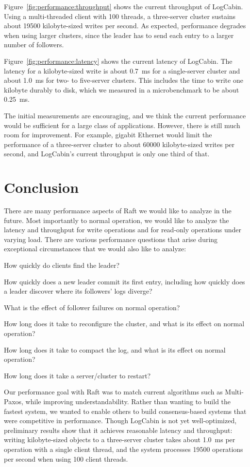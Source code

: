Figure~\ref{fig:performance:throughput} shows the current throughput of
LogCabin. Using a multi-threaded client with 100 threads, a three-server
cluster sustains about \num{19500} kilobyte-sized writes per second.
As expected, performance degrades when using larger clusters, since the
leader has to send each entry to a larger number of followers.


Figure~\ref{fig:performance:latency} shows the current latency of
LogCabin. The latency for a kilobyte-sized write is about
\SI{0.7}{\milli\second} for a single-server cluster and
about \SI{1.0}{\milli\second} for two- to five-server clusters.
This includes the time to write one kilobyte durably to disk,
which we measured in a microbenchmark to be about \SI{.25}{\milli\second}.

The initial measurements are encouraging, and we think the current
performance would be sufficient for a large class of applications.
However, there is still much room for improvement. For example, gigabit
Ethernet would limit the performance of a three-server cluster to
about \num{60000} kilobyte-sized writes per second, and
LogCabin's current throughput is only one third of that.


\section{Conclusion}

There are many performance aspects of Raft we would like to analyze in
the future. Most importantly to normal operation, we would like to
analyze the latency and throughput for write operations and for
read-only operations under varying load. There are various performance
questions that arise during exceptional circumstances that we would also
like to analyze:
%
\begin{compactitem}
%
\item How quickly do clients find the leader?
%
\item How quickly does a new leader commit its first entry, including
how quickly does a leader discover where its followers' logs diverge?
%
\item What is the effect of follower failures on normal operation?
%
\item How long does it take to reconfigure the cluster, and what is its
effect on normal operation?
%
\item How long does it take to compact the log, and what is its effect
on normal operation?
%
\item How long does it take a server/cluster to restart?
%
\end{compactitem}

Our performance goal with Raft was to match current algorithms such as
Multi-Paxos, while improving understandability. Rather than wanting to
build the fastest system, we wanted to enable others to build
consensus-based systems that were competitive in performance.
Though LogCabin is not yet well-optimized, preliminary results show
that it achieves reasonable latency and throughput: writing
kilobyte-sized objects to a three-server cluster takes about
\SI{1.0}{\milli\second} per operation with a single client thread, and the
system processes \num{19500} operations per second when using 100 client
threads.
